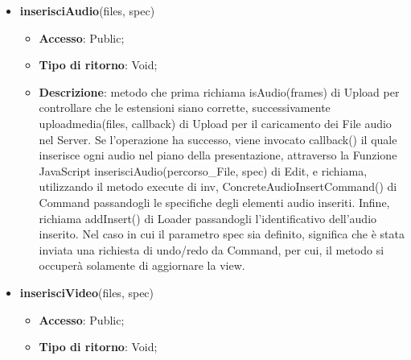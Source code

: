 {{\begin{itemize}
\begin{itemize}
				\item \textbf{Descrizione}: metodo che prima richiama isImage(frames) di Upload per controllare che le estensioni siano corrette, successivamente uploadmedia(files, callback) di Upload per il caricamento dei File immagine nel Server. Se l'operazione ha successo, viene invocato callback() il quale inserisce ogni immagine nel piano della presentazione, attraverso la Funzione javascipt inserisciImmagine(percorso\_File, spec) di Edit, e richiama, utilizzando il metodo execute di inv, ConcreteImageInsertCommand() di Command passandogli le specifiche degli elementi immagine inseriti. Infine, richiama addInsert() di Loader passandogli l'identificativo dell'immagine inserita. Nel caso in cui il parametro spec sia definito, significa che è stata inviata una richiesta di undo/redo da Command, per cui, il metodo si occuperà solamente di aggiornare la view.
			\end{itemize}
			\item \textbf{inserisciAudio}(files, spec)
			\begin{itemize}
				\item \textbf{Accesso}: Public;
				\item \textbf{Tipo di ritorno}: Void;
				\item \textbf{Descrizione}: metodo che prima richiama isAudio(frames) di Upload per controllare che le estensioni siano corrette, successivamente uploadmedia(files, callback) di Upload per il caricamento dei File audio nel Server. Se l'operazione ha successo, viene invocato callback() il quale inserisce ogni audio nel piano della presentazione, attraverso la Funzione\ped{g} JavaScript inserisciAudio(percorso\_File, spec) di Edit, e richiama, utilizzando il metodo execute di inv, ConcreteAudioInsertCommand() di Command passandogli le specifiche degli elementi audio inseriti. Infine, richiama addInsert() di Loader passandogli l'identificativo dell'audio inserito. Nel caso in cui il parametro spec sia definito, significa che è stata inviata una richiesta di undo/redo da Command, per cui, il metodo si occuperà solamente di aggiornare la view.
			\end{itemize}
			\item \textbf{inserisciVideo}(files, spec)
			\begin{itemize}
				\item \textbf{Accesso}: Public;
				\item \textbf{Tipo di ritorno}: Void;

\end{itemize}
\end{itemize}}}
